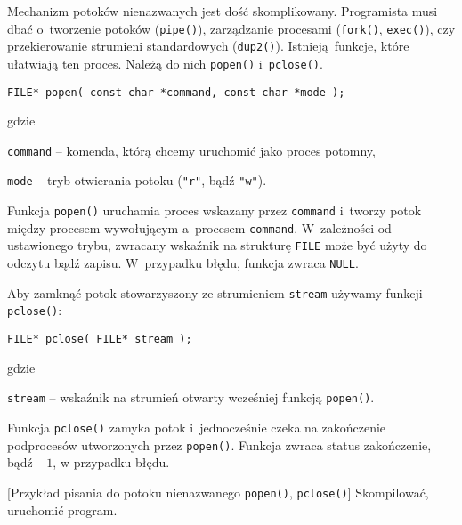 Mechanizm potoków nienazwanych jest dość skomplikowany. Programista musi dbać
o~tworzenie potoków (\texttt{pipe()}), zarządzanie procesami (\texttt{fork()},
\texttt{exec()}), czy przekierowanie strumieni standardowych (\texttt{dup2()}).
Istnieją funkcje, które ułatwiają ten proces. Należą do nich \texttt{popen()}
i~\texttt{pclose()}.
\begin{lstlisting}[style=MyCStyle]
FILE* popen( const char *command, const char *mode );
\end{lstlisting}
gdzie
\begin{myitemize}
  \item \texttt{command} -- komenda, którą chcemy uruchomić jako proces potomny,
  \item \texttt{mode} -- tryb otwierania potoku (\texttt{"r"}, bądź \texttt{"w"}).
\end{myitemize}
Funkcja \texttt{popen()} uruchamia proces wskazany przez \texttt{command}
i~tworzy potok między procesem wywołującym a~procesem \texttt{command}.
W~zależności od ustawionego trybu, zwracany wskaźnik na strukturę \texttt{FILE}
może być użyty do odczytu bądź zapisu. W~przypadku błędu, funkcja zwraca
\texttt{NULL}.

Aby zamknąć potok stowarzyszony ze strumieniem \texttt{stream} używamy funkcji
\texttt{pclose()}:
\begin{lstlisting}[style=MyCStyle]
FILE* pclose( FILE* stream );
\end{lstlisting}
gdzie
\begin{myitemize}
  \item \texttt{stream} -- wskaźnik na strumień otwarty wcześniej funkcją \texttt{popen()}.
\end{myitemize}
Funkcja \texttt{pclose()} zamyka potok i~jednocześnie czeka na zakończenie
podprocesów utworzonych przez \texttt{popen()}. Funkcja zwraca status
zakończenie, bądź $-1$, w przypadku błędu.

\begin{example}{[Przykład pisania do potoku nienazwanego \texttt{popen()}, \texttt{pclose()}]}
  Skompilować, uruchomić program.
  
\end{example}


